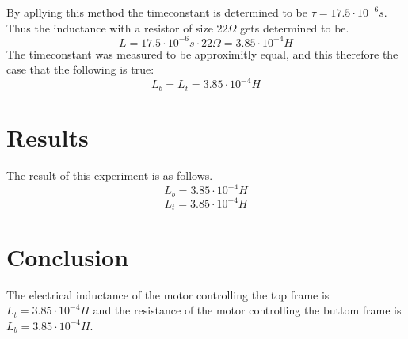 \documentclass[../../rapport/main]{article}
\begin{document}
\newpage

By apllying this method the timeconstant is determined to be $\tau = 17.5 \cdot 10^{-6}s$. Thus the inductance with a resistor of size $22\Omega$ gets determined to be.\\
$$L = 17.5 \cdot 10^{-6}s \cdot 22 \Omega = 3.85 \cdot 10^{-4}H$$
The timeconstant was measured to be approximitly equal, and this therefore the case that the following is true:\\
$$L_b=L_t=3.85 \cdot 10^{-4}H$$

\section{Results}

The result of this experiment is as follows.
$$L_b = 3.85 \cdot 10^{-4}H$$
$$L_t = 3.85 \cdot 10^{-4}H$$

\section{Conclusion}

The electrical inductance of the motor controlling the top frame is $L_t= 3.85 \cdot 10^{-4}H$ and the resistance of the motor controlling the buttom frame is $L_b= 3.85 \cdot 10^{-4}H$.
\end{document}
